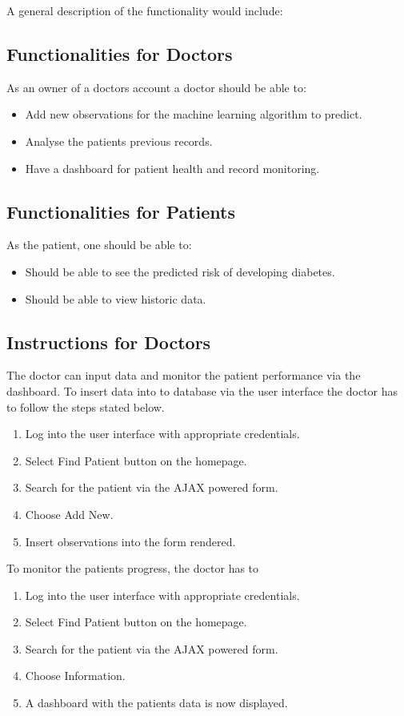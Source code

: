 \documentclass[12pt]{article}
\begin{document}
A general description of the functionality would include:
\subsection{Functionalities for Doctors}
As an owner of a doctors account a doctor should be able to:
\begin{itemize}
\item Add new observations for the machine learning algorithm to predict.
\item Analyse the patients previous records.
\item Have a dashboard for patient health and record monitoring.
\end{itemize}

\subsection{Functionalities for Patients}
As the patient, one should be able to:
\begin{itemize}
\item Should be able to see the predicted risk of developing diabetes.
\item Should be able to view historic data.
\end{itemize}

\subsection{Instructions for Doctors}
The doctor can input data and monitor the patient performance via the dashboard. To insert data into to database via the user interface the doctor has to follow the steps stated below.
\begin{enumerate}
\item Log into the user interface with appropriate credentials.
\item Select Find Patient button on the homepage.
\item Search for the patient via the AJAX powered form.
\item Choose Add New.
\item Insert observations into the form rendered.
\end{enumerate}

To monitor the patients progress, the doctor has to
\begin{enumerate}
\item Log into the user interface with appropriate credentials.
\item Select Find Patient button on the homepage.
\item Search for the patient via the AJAX powered form.
\item Choose Information.
\item A dashboard with the patients data is now displayed.
\end{enumerate} 
\end{document}
